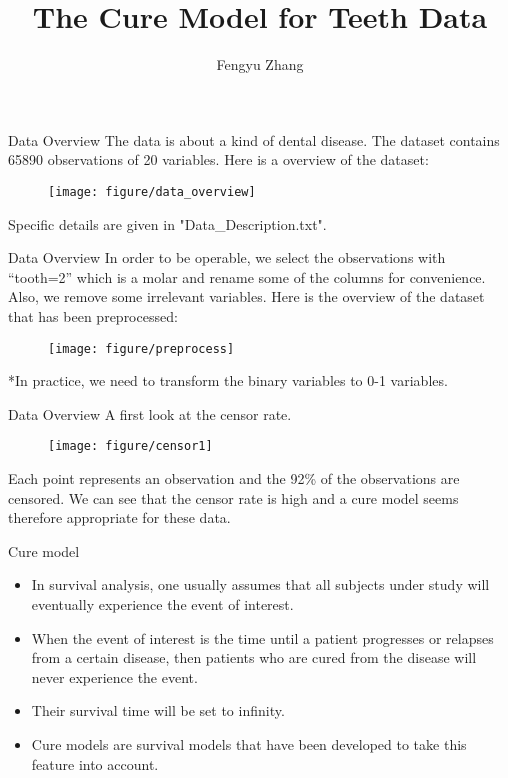 \documentclass[10 pt]{beamer}
\title[]{The Cure Model for Teeth Data}
\author{Fengyu Zhang}
\institute[]{Institute of Statistics \& Big Data \\ Renmin University of China
	
}
\date{}
\begin{document}
	
	\begin{frame}
	\titlepage
\end{frame}



\begin{frame}{Data Overview}
The data is about a kind of dental disease. The dataset contains 65890 observations of 20 variables. Here is a overview of the dataset:
\begin{figure}
	\centering
	\texttt{[image: figure/data\_overview]}
\end{figure}
Specific details are given in "Data\_Description.txt".
\end{frame}

\begin{frame}{Data Overview}
	In order to be operable, we select the observations with “tooth=2” which is a molar and rename some of the columns for convenience. Also, we remove some irrelevant variables. Here is the overview of the dataset that has been preprocessed:
	\begin{figure}
		\texttt{[image: figure/preprocess]}
	\end{figure}
	*In practice, we need to transform the binary variables to 0-1 variables.
\end{frame}

\begin{frame}{Data Overview}
	A first look at the censor rate.
	\begin{figure}
		\texttt{[image: figure/censor1]}
	\end{figure}
Each point represents an observation and the 92\% of the observations are censored. We can see that the censor rate is high and a cure model seems therefore appropriate for these data.
\end{frame}

\begin{frame}{Cure model}
	\begin{itemize}
		\item 	In survival analysis, one usually assumes that all subjects under study will eventually experience the event of interest.
		\item   When the event of interest is the time until a patient progresses or relapses from a certain disease, then patients who are cured from the disease will never experience the event.
		\item 	Their survival time will be set to \textcolor[rgb]{1,0,0}{infinity}.
		\item   Cure models are survival models that have been developed to take this feature into account.
	\end{itemize}

\end{frame}
\end{document}
